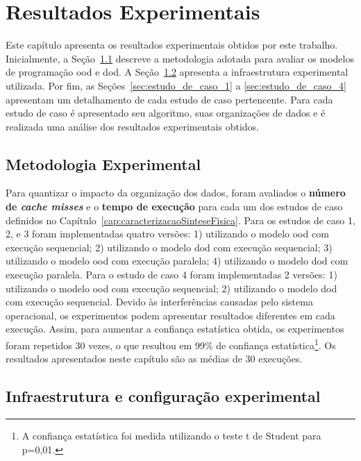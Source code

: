 \chapter{Resultados Experimentais}
\label{cap:resultados}

Este capítulo apresenta os resultados experimentais obtidos por este trabalho. 
Inicialmente, a Seção~\ref{sec:metodologia_experimental} descreve a metodologia adotada para avaliar os modelos de programação \ac{ood} e \ac{dod}.
A Seção~\ref{sec:infraestrutura_experimental} apresenta a infraestrutura experimental utilizada.
Por fim, as Seções~\ref{sec:estudo_de_caso_1} a \ref{sec:estudo_de_caso_4} apresentam um detalhamento de cada estudo de caso pertencente.
Para cada estudo de caso é apresentado seu algoritmo, suas organizações de dados e é realizada uma análise dos resultados experimentais obtidos.


\section{Metodologia Experimental}
\label{sec:metodologia_experimental}

Para quantizar o impacto da organização dos dados, foram avaliados o \textbf{número de  \textit{cache misses}} e o \textbf{tempo de execução} para cada um dos estudos de caso definidos no Capítulo~\ref{cap:caracterizacaoSinteseFisica}.
Para os estudos de caso 1, 2, e 3 foram implementadas quatro versões: 1) utilizando o modelo \ac{ood} com execução sequencial; 2) utilizando o modelo \ac{dod} com execução sequencial; 3) utilizando o modelo \ac{ood} com execução paralela; 4) utilizando o modelo \ac{dod} com execução paralela.
Para o estudo de caso 4 foram implementadas 2 versões: 1) utilizando o modelo \ac{ood} com execução sequencial; 2) utilizando o modelo \ac{dod} com execução sequencial.
Devido às interferências causadas pelo sistema operacional, os experimentos podem apresentar resultados diferentes em cada execução.
Assim, para aumentar a confiança estatística obtida, os experimentos foram repetidos 30 vezes, o que resultou em 99\% de confiança estatística\footnote{A confiança estatística foi medida utilizando o teste t de Student para p=0,01.}. Os resultados apresentados neste capítulo são as médias de 30 execuções.


\section{Infraestrutura e configuração experimental}
\label{sec:infraestrutura_experimental}

